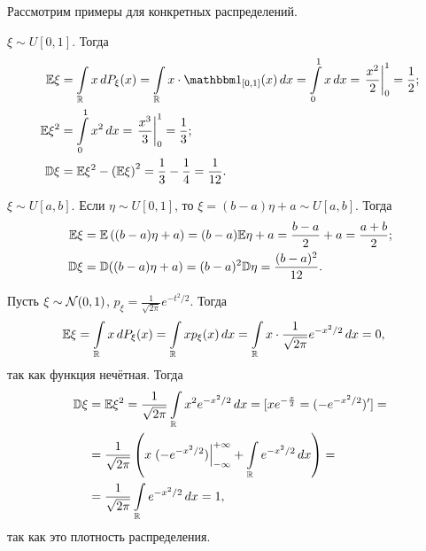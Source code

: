 Рассмотрим примеры для конкретных распределений.

\begin{exmpl}
 $ \xi \sim U[0,1] $. Тогда
 \begin{align*}
  \E\xi &= \int\limits_{\R} x\,dP_\xi(x)  = \int\limits_{\R} x \cdot \Ind_{[0,1]}  (x)\,dx= \int\limits_{0}^{1} x\,dx = \left. \frac{x^{2}}{2} \right|_0^{1} = \frac{1}{2}; \\
   \E\xi^{2} &= \int\limits_{0}^{1} x^{2}\,dx = \left. \frac{x^{3}}{3}\right|_0^{1} = \frac{1}{3}; \\
    \D\xi &= \E\xi^{2} - \left( \E\xi \right)^{2} = \frac{1}{3} - \frac{1}{4} = \frac{1}{12}.
 \end{align*} 
\end{exmpl}
\begin{exmpl}
 $ \xi \sim U[a,b] $. Если $ \eta \sim U[0,1] $, то $ \xi = (b-a)\eta + a\sim U[a,b] $. Тогда
 \begin{align*}
  \mathbb E\xi &= \mathbb E \left( (b-a)\eta + a \right) = (b-a)\mathbb E\eta + a = \frac{b-a}{2} + a = \frac{a+b}{2}; \\
  \mathbb D\xi &= \mathbb D((b-a)\eta + a) = (b-a)^{2}\mathbb D\eta = \frac{(b-a)^{2}}{12}.
 \end{align*} 
\end{exmpl}

\begin{exmpl}
 Пусть $ \xi \sim \mathcal N(0,1) $,  $ p_\xi = \frac{1}{\sqrt{2\pi}}e^{-t^{2} / 2} $. Тогда
 \begin{align*}
  \mathbb E\xi &= \int\limits_{\mathbb{R}} x\,dP_\xi(x) = \int\limits_{\mathbb{R}} x p_\xi(x)\,dx = \int\limits_{\mathbb{R}} x \cdot \frac{1}{\sqrt{2\pi}}      e^{-x^{2} / 2}\,dx = 0,
 \end{align*} так как функция нечётная. Тогда
 \begin{align*}
  \mathbb D\xi &= \mathbb E\xi^{2} = \frac{1}{\sqrt{2\pi}}\int\limits_{\mathbb{R}} x^{2} e^{-x^{2} / 2}\,dx = [xe^{-\frac{x}{2}} = (-e^{-x^{2} / 2})'] = \\
  &= \frac{1}{\sqrt{2\pi}} \left( x \left.(-e^{-x^{2} / 2})\right|_{-\infty}^{+\infty} + \int\limits_{\mathbb{R}} e^{-x^{2} / 2}\,dx  \right) = \\
   &= \frac{1}{\sqrt{2\pi}} \int\limits_{\mathbb{R}} e^{-x^{2} / 2} \,dx = 1,
 \end{align*} так как это плотность распределения.
\end{exmpl}
 
